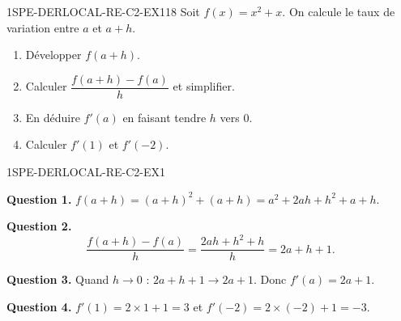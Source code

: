 

\begin{exercice}{1SPE-DERLOCAL-RE-C2-EX1}{1}{8}
Soit $f(x) = x^2 + x$. On calcule le taux de variation entre $a$ et $a+h$.
\begin{enumerate}
  \item Développer $f(a+h)$.
  \item Calculer $\dfrac{f(a+h)-f(a)}{h}$ et simplifier.
  \item En déduire $f'(a)$ en faisant tendre $h$ vers $0$.
  \item Calculer $f'(1)$ et $f'(-2)$.
\end{enumerate}
\end{exercice}



\begin{corrige}{1SPE-DERLOCAL-RE-C2-EX1}

\textbf{Question 1.}
$f(a+h) = (a+h)^2 + (a+h) = a^2 + 2ah + h^2 + a + h.$


\textbf{Question 2.}
\[
\frac{f(a+h)-f(a)}{h} = \frac{2ah+h^2+h}{h} = 2a + h + 1.
\]

\textbf{Question 3.}
Quand $h \to 0$ : $2a+h+1 \to 2a+1$. Donc $f'(a) = 2a+1$.

\textbf{Question 4.}
$f'(1) = 2 \times 1 + 1 = 3$ et $f'(-2) = 2 \times (-2) + 1 = -3$.

\end{corrige}


